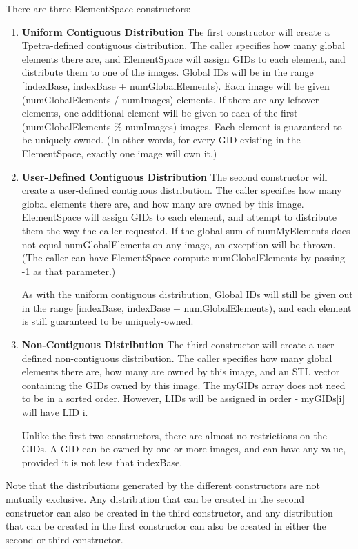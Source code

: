 \documentclass[10pt,relax]{TpetraDesign}
\begin{document}
There are three ElementSpace constructors:

\begin{enumerate}
\item \textbf{Uniform Contiguous Distribution}
The first constructor will create a Tpetra-defined contiguous distribution. The caller specifies how many global elements there are, and ElementSpace will assign GIDs to each element, and distribute them to one of the images. Global IDs will be in the range [indexBase, indexBase + numGlobalElements). Each image will be given (numGlobalElements / numImages) elements. If there are any leftover elements, one additional element will be given to each of the first (numGlobalElements \% numImages) images.
Each element is guaranteed to be uniquely-owned. (In other words, for every GID existing in the ElementSpace, exactly one image will own it.)

\item \textbf{User-Defined Contiguous Distribution}
The second constructor will create a user-defined contiguous distribution. The caller specifies how many global elements there are, and how many are owned by this image. ElementSpace will assign GIDs to each element, and attempt to distribute them the way the caller requested. If the global sum of numMyElements does not equal numGlobalElements on any image, an exception will be thrown. (The caller can have ElementSpace compute numGlobalElements by passing -1 as that parameter.)

As with the uniform contiguous distribution, Global IDs will still be given out in the range [indexBase, indexBase + numGlobalElements), and each element is still guaranteed to be uniquely-owned.

\item \textbf{Non-Contiguous Distribution}
The third constructor will create a user-defined non-contiguous distribution. The caller specifies how many global elements there are, how many are owned by this image, and an STL vector containing the GIDs owned by this image. The myGIDs array does not need to be in a sorted order. However, LIDs will be assigned in order - myGIDs[i] will have LID i.

Unlike the first two constructors, there are almost no restrictions on the GIDs. A GID can be owned by one or more images, and can have any value, provided it is not less that indexBase.

\end{enumerate}

Note that the distributions generated by the different constructors are not mutually exclusive. Any distribution that can be created in the second constructor can also be created in the third constructor, and any distribution that can be created in the first constructor can also be created in either the second or third constructor.
\end{document}
